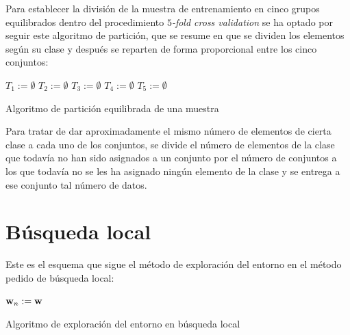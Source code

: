 \documentclass{article}
\newenvironment{algo}{
	\vspace*{0.5cm}
	\begin{algorithm}[H]}{
	\end{algorithm}
	\vspace*{0.5cm}
}
\begin{document}
Para establecer la división de la muestra de entrenamiento en cinco grupos equilibrados dentro del procedimiento \textit{$5$-fold cross validation} se ha optado por seguir este algoritmo de partición, que se resume en que se dividen los elementos según su clase y después se reparten de forma proporcional entre los cinco conjuntos:

\begin{algo}

	$T_1 := \emptyset$\;
	$T_2 := \emptyset$\;
	$T_3 := \emptyset$\;
	$T_4 := \emptyset$\;
	$T_5 := \emptyset$\;
	
	\vspace{0.2cm}
	\caption{Algoritmo de partición equilibrada de una muestra}
\end{algo}

Para tratar de dar aproximadamente el mismo número de elementos de cierta clase a cada uno de los conjuntos, se divide el número de elementos de la clase que todavía no han sido asignados a un conjunto por el número de conjuntos a los que todavía no se les ha asignado ningún elemento de la clase y se entrega a ese conjunto tal número de datos.

\section{Búsqueda local}

Este es el esquema que sigue el método de exploración del entorno en el método pedido de búsqueda local:

\begin{algo}

	$\normalfont \textbf w_n := \normalfont \textbf w$\;

	\vspace{0.2cm}
	\caption{Algoritmo de exploración del entorno en búsqueda local}
\end{algo}
\end{document}
